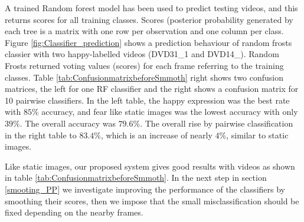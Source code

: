 A trained Random forest model has been used to predict testing videos, and this returns scores for all training classes. Scores (posterior probability generated by each tree is a matrix with one row per observation and one column per class.
Figure \ref{fig:Classifier_prediction} shows a prediction behaviour of random frosts classier with two happy-labelled videos (DVD31\_1 and DVD14\_). Random Frosts returned voting values (scores) for each frame referring to the training classes.
Table \ref{tab:ConfusionmatrixbeforeSmmoth} right shows two confusion matrices, the left for one RF classifier and the right shows a confusion matrix for 10 pairwise classifiers. In the left table, the happy expression was the best rate with $85\%$ accuracy, and fear like static images was the lowest accuracy with only $39\%$.  The overall accuracy was $79.6\%$. The overall rise by pairwise classification in the right table to $83.4\%$, which is an increase of nearly $4\%$, similar to static images.

Like static images, our proposed system gives good results with videos as shown in table \ref{tab:ConfusionmatrixbeforeSmmoth}. In the next step in section \ref{smooting_PP} we investigate improving the performance of the classifiers by smoothing their scores, then we impose that the small misclassification should be fixed depending on the nearby frames.

